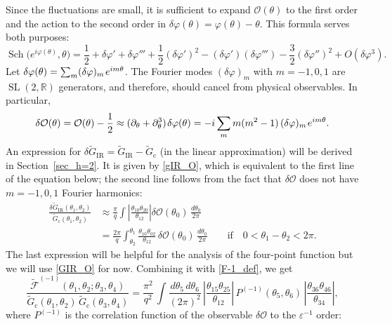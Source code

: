 \documentclass[12pt]{article}
\newcommand{\calF}{\mathcal{F}}
\newcommand{\calO}{\mathcal{O}}
\newcommand{\RR}{\mathbb{R}}
\DeclareMathOperator{\SL}{SL}
\DeclareMathOperator{\Sch}{Sch}
\newcommand{\cc}{\mathrm{c}}
\newcommand{\IR}{\text{IR}}
\newcommand{\tG}{\widetilde{G}}
\newcommand{\tF}{\widetilde{\calF}}
\newcommand{\OO}{\mathcal{O}}
\newcommand{\vep}{\varepsilon}
\newcommand{\vp}{\varphi}
\begin{document}
Since the fluctuations are small, it is sufficient to expand $\calO(\theta)$ to the first order and the action to the second order in $\delta\vp(\theta)=\vp(\theta)-\theta$. This formula serves both purposes:
\begin{equation}
\Sch\bigl(e^{i\vp(\theta)},\theta\bigr)
=\frac{1}{2}+\delta\vp'+\delta\vp'''
+\frac{1}{2}(\delta\vp')^2
-(\delta\vp')(\delta\vp''')-\frac{3}{2}(\delta\vp'')^2+O(\delta\vp^3).
\end{equation}
Let $\delta\vp(\theta)=\sum_{m}(\delta\vp)_{m}\kern1pt e^{im\theta}$. The Fourier modes $(\delta\vp)_{m}$ with $m=-1,0,1$ are $\SL(2,\RR)$ generators, and therefore, should cancel from physical observables. In particular,
\begin{equation}\label{deltaO}
\delta\calO(\theta) = \calO(\theta)-\frac{1}{2}
\approx (\partial_{\theta}+\partial_{\theta}^3)\kern1pt\delta\vp(\theta)
=-i\sum_{m}m(m^2-1)\,(\delta\vp)_{m}\kern1pt e^{im\theta}.
\end{equation}
An expression for $\delta\tG_{\IR}=\tG_{\IR}-\tG_{\cc}$ (in the linear approximation) will be derived in Section~\ref{sec_h=2}. It is given by \eqref{gIR_O}, which is equivalent to the first line of the equation below; the second line follows from the fact that $\delta\OO$ does not have $m=-1,0,1$ Fourier harmonics:
\begin{align}\label{GIR_O}
\frac{\delta \tG_{\IR}(\theta_1,\theta_2)}{\tG_{\cc}(\theta_1,\theta_2)}
&\approx \frac{\pi}{q}\int
\left|\frac{\theta_{10}\theta_{20}}{\theta_{12}}\right|
\delta\OO(\theta_0)\,\frac{d\theta_0}{2\pi}
\\[3pt]
\label{GIR_O1}
&=\frac{2\pi}{q}\int_{\theta_2}^{\theta_1}
\frac{\theta_{10}\theta_{02}}{\theta_{12}}\,
\delta\OO(\theta_0)\,\frac{d\theta_0}{2\pi}\qquad
\text{if}\quad 0<\theta_1-\theta_2<2\pi.
\end{align}
The last expression will be helpful for the analysis of the four-point function but we will use \eqref{GIR_O} for now. Combining it with \eqref{F-1_def}, we get 
\begin{equation}\label{F-1_0}
\frac{\tF^{(-1)}(\theta_1,\theta_2;\theta_3,\theta_4)}
{\tG_{\cc}(\theta_1,\theta_2)\,\tG_{\cc}(\theta_3,\theta_4)}
=\frac{\pi^2}{q^2}\,
\int\frac{d\theta_{5}\,d\theta_6}{(2\pi)^2}\,
\left|\frac{\theta_{15}\theta_{25}}{\theta_{12}}\right|\,
P^{(-1)}(\theta_5,\theta_6)\,
\left|\frac{\theta_{36}\theta_{46}}{\theta_{34}}\right|,
\end{equation}
where $P^{(-1)}$ is the correlation function of the observable $\delta\calO$ to the $\vep^{-1}$ order:
\end{document}
